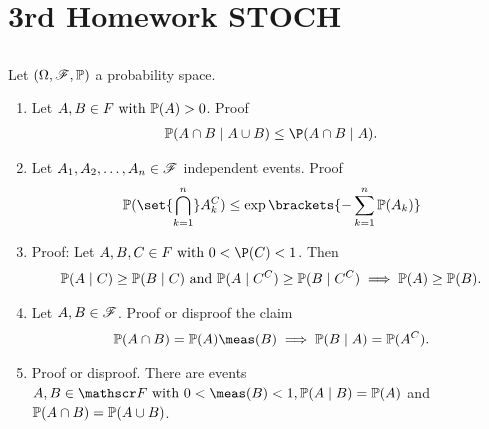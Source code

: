 
\section{3rd Homework STOCH}
\subsection{}
Let $(\Omega, \mathscr{F}, \mathbb{P})$ a probability space.
\begin{enumerate}
	\item Let $A,B \in F \text{ with } \mathbb{P}(A) >0$. Proof
	\begin{align*}
		\Meas(A\cap B \mid A\cup B) \le \P(A \cap B \mid A).
	\end{align*}
	\item Let $A_1 , A_2 , \dots , A_n \in \mathscr{F}$ independent events. Proof
	\begin{align*}
		\Meas(\set{\bigcap_{k=1}^n} A^C_k) \le \exp\brackets{- \sum_{k=1}^{n} \Meas(A_k)}
	\end{align*}
	\item Proof: Let $A,B,C \in F \with 0 < \P(C) < 1$. Then
	\begin{align*}
		\mathbb{P}(A\mid C) \ge \mathbb{P}(B \mid C) \text{ and } \mathbb{P}(A \mid C^C) \ge \mathbb{P}(B \mid C^C) \implies \mathbb{P}(A) \ge \mathbb{P}(B).
	\end{align*}
	\item Let $A, B \in \mathscr{F}$. Proof or disproof the claim
	\begin{align*}
		\Meas(A\cap B) = \Meas(A)\meas(B) \implies \Meas(B \mid A) = \Meas(A^C).
	\end{align*}
	\item Proof or disproof. There are events $A,B \in \F \with 0 < \meas(B) < 1, \Meas(A\mid B) = \Meas(A)$ and $\mathbb{P}(A \cap B) = \mathbb{P}(A \cup B)$.
	\begin{align*}
	\end{align*}
\end{enumerate}

